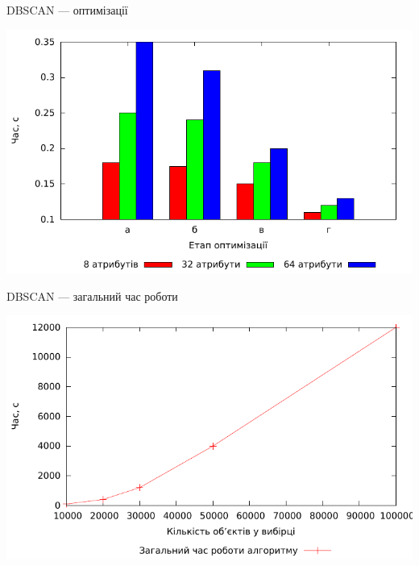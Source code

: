 \documentclass{beamer}
\begin{document}
    
    \begin{frame}{DBSCAN --- оптимізації}
        \begin{center}
            \includegraphics[scale=0.8]{dbscan_compare.pdf}
        \end{center}
    \end{frame}
    
    \begin{frame}{DBSCAN --- загальний час роботи}
        \begin{center}
            \includegraphics[scale=0.8]{dbscan_complexity.pdf}
        \end{center}
    \end{frame}    
    
\end{document}
